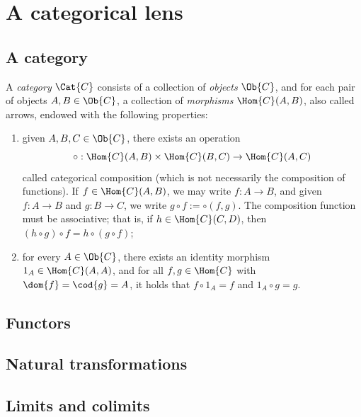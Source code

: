\documentclass[../main]{subfiles}
\begin{document}
\chapter{A categorical lens}


\section{A category}

A \emph{category} \(\Cat{C}\) consists of a collection of \emph{objects} \(\Ob{C}\), and for each pair of objects \(A,B \in \Ob{C}\), a collection of \emph{morphisms} \(\Hom{C}(A,B)\), also called arrows, endowed with the following properties:

\begin{enumerate}
\item given \(A,B,C \in \Ob{C}\), there exists an operation
  \[
    \circ : \Hom{C}(A,B) \times \Hom{C}(B,C) \to \Hom{C}(A,C)
  \]
  called categorical composition (which is not necessarily the composition of functions). If \(f \in \Hom{C}(A,B)\), we may write \(f \colon A \to B\), and given \(f : A \to B\) and \(g : B \to C\), we write \(g \circ f := {\circ}(f,g)\). The composition function must be associative; that is, if \(h \in \Hom{C}(C,D)\), then \((h \circ g) \circ f = h \circ (g \circ f)\);
\item for every \(A \in \Ob{C}\), there exists an identity morphism \(1_A \in \Hom{C}(A,A)\), and for all \(f,g \in \Hom{C}\) with \(\dom{f} = \cod{g} = A\), it holds that \(f \circ 1_A = f\) and \(1_A \circ g = g\).
\end{enumerate}
   
\section{Functors}
\section{Natural transformations}
\section{Limits and colimits}\label{sec:limits-colimits}
\end{document}

